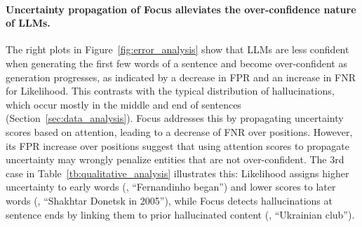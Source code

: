 \paragraph{Uncertainty propagation of Focus alleviates the over-confidence nature of LLMs.}
The right plots in Figure~\ref{fig:error_analysis} show that LLMs are less confident when generating the first few words of a sentence and become over-confident as generation progresses, as indicated by a decrease in FPR and an increase in FNR for Likelihood. This contrasts with the typical distribution of hallucinations, which occur mostly in the middle and end of sentences (Section~\ref{sec:data_analysis}). Focus addresses this by propagating uncertainty scores based on attention, leading to a decrease of FNR over positions. However, its FPR increase over positions suggest that using attention scores to propagate uncertainty may wrongly penalize entities that are not over-confident. The 3rd case in Table~\ref{tb:qualitative_analysis} illustrates this: Likelihood assigns higher uncertainty to early words (\eg, ``Fernandinho began'') and lower scores to later words (\eg, ``Shakhtar Donetsk in 2005''), while Focus detects hallucinations at sentence ends by linking them to prior hallucinated content (\eg, ``Ukrainian club'').
